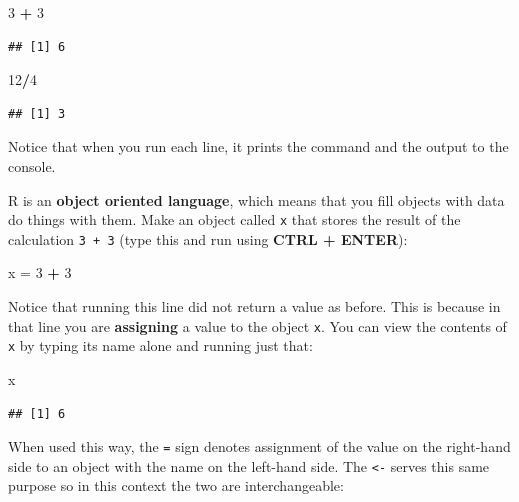 \documentclass[]{book}
\newenvironment{Shaded}{\begin{snugshade}}{\end{snugshade}}
\newcommand{\DecValTok}[1]{\textcolor[rgb]{0.00,0.00,0.81}{#1}}
\newcommand{\StringTok}[1]{\textcolor[rgb]{0.31,0.60,0.02}{#1}}
\newcommand{\OperatorTok}[1]{\textcolor[rgb]{0.81,0.36,0.00}{\textbf{#1}}}
\newcommand{\NormalTok}[1]{#1}
\theoremstyle{definition}
\theoremstyle{definition}
\theoremstyle{definition}
\theoremstyle{remark}
\begin{document}
\begin{Shaded}
\begin{Highlighting}[]
\DecValTok{3} \OperatorTok{+}\StringTok{ }\DecValTok{3}
\end{Highlighting}
\end{Shaded}

\begin{verbatim}
## [1] 6
\end{verbatim}

\begin{Shaded}
\begin{Highlighting}[]
\DecValTok{12}\OperatorTok{/}\DecValTok{4}
\end{Highlighting}
\end{Shaded}

\begin{verbatim}
## [1] 3
\end{verbatim}

Notice that when you run each line, it prints the command and the output
to the console.

R is an \textbf{object oriented language}, which means that you fill
objects with data do things with them. Make an object called \texttt{x}
that stores the result of the calculation \texttt{3\ +\ 3} (type this
and run using \textbf{CTRL + ENTER}):

\begin{Shaded}
\begin{Highlighting}[]
\NormalTok{x =}\StringTok{ }\DecValTok{3} \OperatorTok{+}\StringTok{ }\DecValTok{3}
\end{Highlighting}
\end{Shaded}

Notice that running this line did not return a value as before. This is
because in that line you are \textbf{assigning} a value to the object
\texttt{x}. You can view the contents of \texttt{x} by typing its name
alone and running just that:

\begin{Shaded}
\begin{Highlighting}[]
\NormalTok{x}
\end{Highlighting}
\end{Shaded}

\begin{verbatim}
## [1] 6
\end{verbatim}

When used this way, the \texttt{=} sign denotes assignment of the value
on the right-hand side to an object with the name on the left-hand side.
The \texttt{\textless{}-} serves this same purpose so in this context
the two are interchangeable:
\end{document}
